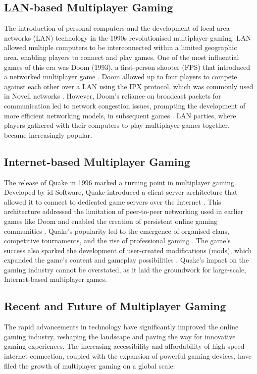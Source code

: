 \subsection{LAN-based Multiplayer Gaming}
The introduction of personal computers and the development of local area networks (LAN) technology in the 1990s revolutionised multiplayer gaming. LAN allowed multiple computers to be interconnected within a limited geographic area, enabling players to connect and play games. One of the most influential games of this era was Doom (1993), a first-person shooter (FPS) that introduced a networked multiplayer game \cite{arm2006networking}. Doom allowed up to four players to compete against each other over a LAN using the IPX protocol, which was commonly used in Novell networks \cite{Doom}. However, Doom's reliance on broadcast packets for communication led to network congestion issues, prompting the development of more efficient networking models, in subsequent games \cite{arm2006networking}. LAN parties, where players gathered with their computers to play multiplayer games together, became increasingly popular.

\subsection{Internet-based Multiplayer Gaming}
The release of Quake in 1996 marked a turning point in multiplayer gaming. Developed by id Software, Quake introduced a client-server architecture that allowed it to connect to dedicated game servers over the Internet \cite{arm2006networking}. This architecture addressed the limitation of peer-to-peer networking used in earlier games like Doom and enabled the creation of persistent online gaming communities \cite{Doom}. Quake's popularity led to the emergence of organised clans, competitive tournaments, and the rise of professional gaming \cite{arm2006networking}. The game's success also sparked the development of user-created modifications (mods), which expanded the game's content and gameplay possibilities \cite{Doom}.
Quake's impact on the gaming industry cannot be overstated, as it laid the groundwork for large-scale, Internet-based multiplayer games.

\subsection{Recent and Future of  Multiplayer Gaming}
The rapid advancements in technology have significantly improved the online gaming industry, reshaping the landscape and paving the way for innovative gaming experiences. The increasing accessibility and affordability of high-speed internet connection, coupled with the expansion of powerful gaming devices, have filed the growth of multiplayer gaming on a global scale.

